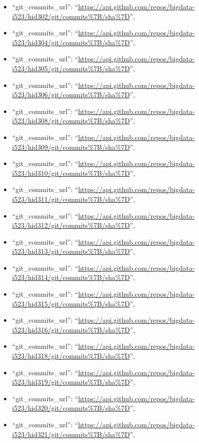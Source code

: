 \begin{itemize}
\item
  ``git\_commits\_url'':
  ``\url{https://api.github.com/repos/bigdata-i523/hid302/git/commits\%7B/sha\%7D}'',
\item
  ``git\_commits\_url'':
  ``\url{https://api.github.com/repos/bigdata-i523/hid304/git/commits\%7B/sha\%7D}'',
\item
  ``git\_commits\_url'':
  ``\url{https://api.github.com/repos/bigdata-i523/hid305/git/commits\%7B/sha\%7D}'',
\item
  ``git\_commits\_url'':
  ``\url{https://api.github.com/repos/bigdata-i523/hid306/git/commits\%7B/sha\%7D}'',
\item
  ``git\_commits\_url'':
  ``\url{https://api.github.com/repos/bigdata-i523/hid308/git/commits\%7B/sha\%7D}'',
\item
  ``git\_commits\_url'':
  ``\url{https://api.github.com/repos/bigdata-i523/hid309/git/commits\%7B/sha\%7D}'',
\item
  ``git\_commits\_url'':
  ``\url{https://api.github.com/repos/bigdata-i523/hid310/git/commits\%7B/sha\%7D}'',
\item
  ``git\_commits\_url'':
  ``\url{https://api.github.com/repos/bigdata-i523/hid311/git/commits\%7B/sha\%7D}'',
\item
  ``git\_commits\_url'':
  ``\url{https://api.github.com/repos/bigdata-i523/hid312/git/commits\%7B/sha\%7D}'',
\item
  ``git\_commits\_url'':
  ``\url{https://api.github.com/repos/bigdata-i523/hid313/git/commits\%7B/sha\%7D}'',
\item
  ``git\_commits\_url'':
  ``\url{https://api.github.com/repos/bigdata-i523/hid314/git/commits\%7B/sha\%7D}'',
\item
  ``git\_commits\_url'':
  ``\url{https://api.github.com/repos/bigdata-i523/hid315/git/commits\%7B/sha\%7D}'',
\item
  ``git\_commits\_url'':
  ``\url{https://api.github.com/repos/bigdata-i523/hid316/git/commits\%7B/sha\%7D}'',
\item
  ``git\_commits\_url'':
  ``\url{https://api.github.com/repos/bigdata-i523/hid318/git/commits\%7B/sha\%7D}'',
\item
  ``git\_commits\_url'':
  ``\url{https://api.github.com/repos/bigdata-i523/hid319/git/commits\%7B/sha\%7D}'',
\item
  ``git\_commits\_url'':
  ``\url{https://api.github.com/repos/bigdata-i523/hid320/git/commits\%7B/sha\%7D}'',
\item
  ``git\_commits\_url'':
  ``\url{https://api.github.com/repos/bigdata-i523/hid321/git/commits\%7B/sha\%7D}'',

\end{itemize}
